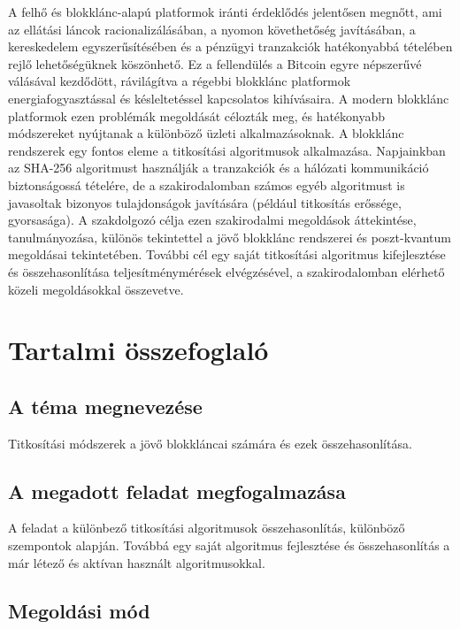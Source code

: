\documentclass[12pt]{report} %
\begin{document}
A felhő és blokklánc-alapú platformok iránti érdeklődés jelentősen megnőtt, ami az ellátási láncok racionalizálásában, a nyomon követhetőség javításában, a kereskedelem egyszerűsítésében és a pénzügyi tranzakciók hatékonyabbá tételében rejlő lehetőségüknek köszönhető. Ez a fellendülés a Bitcoin egyre népszerűvé válásával kezdődött, rávilágítva a régebbi blokklánc platformok energiafogyasztással és késleltetéssel kapcsolatos kihívásaira. A modern blokklánc platformok ezen problémák megoldását célozták meg, és hatékonyabb módszereket nyújtanak a különböző üzleti alkalmazásoknak. A blokklánc rendszerek egy fontos eleme a titkosítási algoritmusok alkalmazása. Napjainkban az SHA-256 algoritmust használják a tranzakciók és a hálózati kommunikáció biztonságossá tételére, de a szakirodalomban számos egyéb algoritmust is javasoltak bizonyos tulajdonságok javítására (például titkosítás erőssége, gyorsasága). A szakdolgozó célja ezen szakirodalmi megoldások áttekintése, tanulmányozása, különös tekintettel a jövő blokklánc rendszerei és poszt-kvantum megoldásai tekintetében. További cél egy saját titkosítási algoritmus kifejlesztése és összehasonlítása teljesítménymérések elvégzésével, a szakirodalomban elérhető közeli megoldásokkal összevetve.

\chapter*{Tartalmi összefoglaló} %

\section*{A téma megnevezése} %

Titkosítási módszerek a jövő blokkláncai számára és ezek összehasonlítása.

\section*{A megadott feladat megfogalmazása} %

A feladat a különbező titkosítási algoritmusok összehasonlítás, különböző szempontok alapján. Továbbá egy saját algoritmus fejlesztése és összehasonlítás a már létező és aktívan használt algoritmusokkal.

\section*{Megoldási mód} %
\end{document}
